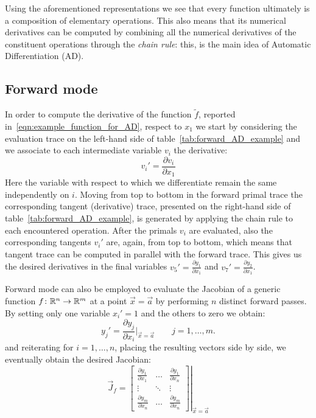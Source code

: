 Using the aforementioned representations we see that every function ultimately is a composition of elementary operations. This also means that its numerical derivatives can be computed by combining all the numerical derivatives of the constituent operations through the \emph{chain rule}: this, is the main idea of Automatic Differentiation (AD).



\subsection{Forward mode}
\label{subsec:forward_mode_AD}

In order to compute the derivative of the function $\tilde{f}$, reported in~\eqref{eqn:example_function_for_AD}, respect to $x_1$ we start by considering the evaluation trace on the left-hand side of table~\ref{tab:forward_AD_example} and we associate to each intermediate variable $ v_i$ the derivative:
\[
	v_i' = \frac{\partial v_i}{\partial x_1}
\]
Here the variable with respect to which we differentiate remain the same independently on $i$.
Moving from top to bottom in the forward primal trace the corresponding tangent (derivative) trace, presented on the right-hand side of table~\ref{tab:forward_AD_example}, is generated by applying the chain rule to each encountered operation. After the primals $v_i$ are evaluated, also the corresponding tangents $v_i'$ are, again, from top to bottom, which means that tangent trace can be computed in parallel with the forward trace. This gives us the desired derivatives in the final variables $v_5' = \frac{\partial y_1}{\partial x_1}$ and $v_7' = \frac{\partial y_2}{\partial x_1}$.

\medskip
Forward mode can also be employed to evaluate the Jacobian of a generic function $f \colon \mathbb{R}^n \to \mathbb{R}^m$ at a point $\vec{x} = \vec{a}$ by performing $n$ distinct forward passes. By setting only one variable $x_i'=1$ and the others to zero we obtain:
\[
	y_j' = \frac{\partial y_j}{\partial x_i}\bigg|_{\vec{x}=\vec{a}} \qquad j=1,\dots,m.
\]
and reiterating for $i=1,\dots,n$, placing the resulting vectors side by side, we eventually obtain the desired Jacobian:
\[
\vec{J}_f =
\left.
\begin{bmatrix}
	\frac{\partial y_1}{\partial x_1} &  \dots  & \frac{\partial y_1}{\partial x_n}  \\
	\vdots							  & \ddots  & \vdots							 \\
	\frac{\partial y_m}{\partial x_n} &  \dots  & \frac{\partial y_m}{\partial x_n}
\end{bmatrix}
\right|_{\vec{x} = \vec{a}}
\]

